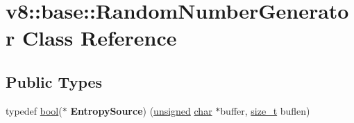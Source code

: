 \hypertarget{classv8_1_1base_1_1RandomNumberGenerator}{}\section{v8\+:\+:base\+:\+:Random\+Number\+Generator Class Reference}
\label{classv8_1_1base_1_1RandomNumberGenerator}
\subsection*{Public Types}
\begin{DoxyCompactItemize}
\item 
\mbox{\label{classv8_1_1base_1_1RandomNumberGenerator_ab60ef43489dd07c6d39d1fa1e117f625}} 
typedef \mbox{\hyperlink{classbool}{bool}}($\ast$ {\bfseries Entropy\+Source}) (\mbox{\hyperlink{classunsigned}{unsigned}} \mbox{\hyperlink{classchar}{char}} $\ast$buffer, \mbox{\hyperlink{classsize__t}{size\+\_\+t}} buflen)
\end{DoxyCompactItemize}
